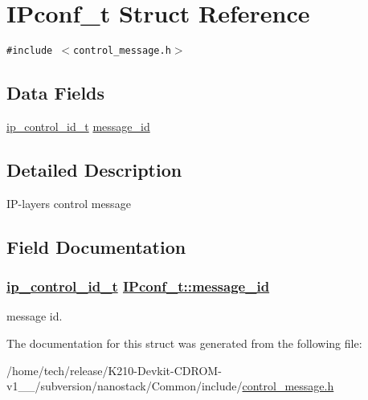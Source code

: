 \hypertarget{structIPconf__t}{
\section{IPconf\_\-t Struct Reference}
\label{structIPconf__t}
}
{\tt \#include $<$control\_\-message.h$>$}

\subsection*{Data Fields}
\begin{CompactItemize}
\item 
\hyperlink{control__message_8h_a517e422e7baca3bcf3f4676a7a70597}{ip\_\-control\_\-id\_\-t} \hyperlink{structIPconf__t_1cc2a0f7ff4c6bb6ad19af758d25e25a}{message\_\-id}
\end{CompactItemize}


\subsection{Detailed Description}
IP-layers control message 



\subsection{Field Documentation}
\hypertarget{structIPconf__t_1cc2a0f7ff4c6bb6ad19af758d25e25a}{
\subsubsection[message\_\-id]{\setlength{\rightskip}{0pt plus 5cm}\hyperlink{control__message_8h_a517e422e7baca3bcf3f4676a7a70597}{ip\_\-control\_\-id\_\-t} \hyperlink{structIPconf__t_1cc2a0f7ff4c6bb6ad19af758d25e25a}{IPconf\_\-t::message\_\-id}}}
\label{structIPconf__t_1cc2a0f7ff4c6bb6ad19af758d25e25a}


message id. 

The documentation for this struct was generated from the following file:\begin{CompactItemize}
\item 
/home/tech/release/K210-Devkit-CDROM-v1\_\_/subversion/nanostack/Common/include/\hyperlink{control__message_8h}{control\_\-message.h}\end{CompactItemize}
